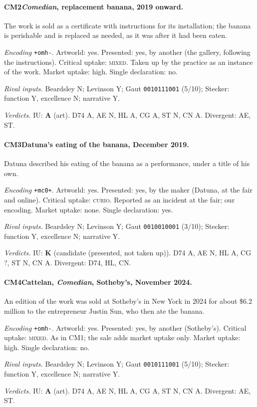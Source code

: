\paragraph{CM2\enspace \emph{Comedian}, replacement banana, 2019 onward.}
The work is sold as a certificate with instructions for its installation; the banana is perishable and is replaced as needed, as it was after it had been eaten.\par
\noindent\textit{Encoding} \texttt{+omh-}. Artworld: yes. Presented: yes, by another (the gallery, following the instructions). Critical uptake: \textsc{mixed}. Taken up by the practice as an instance of the work. Market uptake: high. Single declaration: no.\par
\noindent\textit{Rival inputs.} Beardsley N; Levinson Y; Gaut \texttt{0010111001} (5/10); Stecker: function Y, excellence N; narrative Y.\par
\noindent\textit{Verdicts.} IU: \textbf{A} (art). D74 A, AE N, HL A, CG A, ST N, CN A. Divergent: AE, ST.\par

\paragraph{CM3\enspace Datuna's eating of the banana, December 2019.}
Datuna described his eating of the banana as a performance, under a title of his own.\par
\noindent\textit{Encoding} \texttt{+mc0+}. Artworld: yes. Presented: yes, by the maker (Datuna, at the fair and online). Critical uptake: \textsc{curio}. Reported as an incident at the fair; our encoding. Market uptake: none. Single declaration: yes.\par
\noindent\textit{Rival inputs.} Beardsley N; Levinson Y; Gaut \texttt{0010010001} (3/10); Stecker: function Y, excellence N; narrative Y.\par
\noindent\textit{Verdicts.} IU: \textbf{K} (candidate (presented, not taken up)). D74 A, AE N, HL A, CG ?, ST N, CN A. Divergent: D74, HL, CN.\par

\paragraph{CM4\enspace Cattelan, \emph{Comedian}, Sotheby's, November 2024.}
An edition of the work was sold at Sotheby's in New York in 2024 for about \$6.2 million to the entrepreneur Justin Sun, who then ate the banana.\par
\noindent\textit{Encoding} \texttt{+omh-}. Artworld: yes. Presented: yes, by another (Sotheby's). Critical uptake: \textsc{mixed}. As in CM1; the sale adds market uptake only. Market uptake: high. Single declaration: no.\par
\noindent\textit{Rival inputs.} Beardsley N; Levinson Y; Gaut \texttt{0010111001} (5/10); Stecker: function Y, excellence N; narrative Y.\par
\noindent\textit{Verdicts.} IU: \textbf{A} (art). D74 A, AE N, HL A, CG A, ST N, CN A. Divergent: AE, ST.\par

